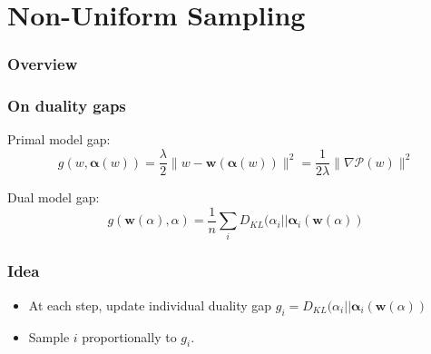 \documentclass{beamer}
\DeclareMathOperator{\1}{\mathbb{1}}
\begin{document}
\section{Non-Uniform Sampling}
\begin{frame}
	\frametitle{Overview}
	\tableofcontents[currentsection] 
\end{frame}
\begin{frame}
	\frametitle{On duality gaps}
	
	Primal model gap:
	\begin{equation*}
		\label{primal duality gap}
		g(w,\bm \alpha(w)) = \frac{\lambda}{2} \|w- \bm w(\bm \alpha(w))\|^2 = \frac{1}{2 \lambda} \|\nabla \mathscr P(w)\|^2
	\end{equation*}
	
	Dual model gap:
	\begin{equation*}
		g(\bm w(\alpha),\alpha) = \frac{1}{n} \sum_i D_{KL} (\alpha_i || \bm \alpha_i(\bm w(\alpha))
	\end{equation*}
	
\end{frame}
\begin{frame}
	\frametitle{Idea}
	
	\begin{itemize}
		\item At each step, update individual duality gap $ g_i = D_{KL} (\alpha_i || \bm \alpha_i(\bm w(\alpha))$
		\item Sample $i$ proportionally to $g_i$.
	\end{itemize}
	
	
	
\end{frame}
\end{document}
